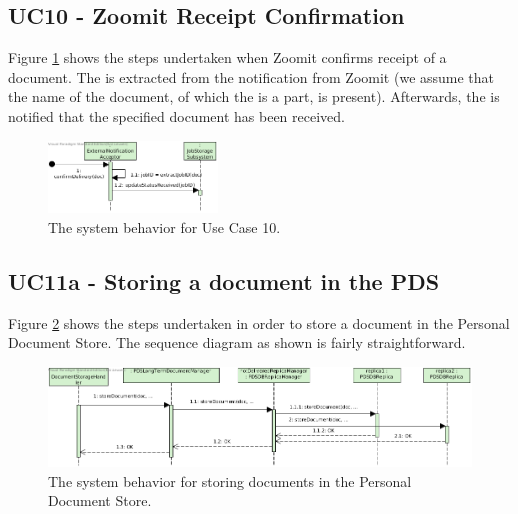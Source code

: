 \subsection{UC10 - Zoomit Receipt Confirmation}
Figure \ref{fig:seq_uc10} shows the steps undertaken when Zoomit confirms receipt of a document. The  is extracted from the notification from Zoomit (we assume that the name of the document, of which the  is a part, is present). Afterwards, the  is notified that the specified document has been received.

\begin{figure}[!htp]
    \centering
    \includegraphics[width=0.4\textwidth]{figures/UC10 - Zoomit Receipt Confirmation.png}
    \caption{The system behavior for Use Case 10.
        }\label{fig:seq_uc10}
\end{figure}

\subsection{UC11a - Storing a document in the PDS} 
Figure \ref{fig:seq_uc11a} shows the steps undertaken in order to store a document in the Personal Document Store. The sequence diagram as shown is fairly straightforward.

\begin{figure}[!htp]
    \centering
    \includegraphics[width=\textwidth]{figures/UC11a - Storing a document in the PDS.png}
    \caption{The system behavior for storing documents in the Personal Document Store.
        }\label{fig:seq_uc11a}
\end{figure}

